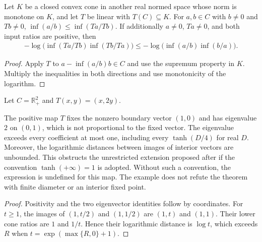 \begin{theorem}
    \label{thm:cone_ratio_positive_map}
    \leanok
    Let $K$ be a closed convex cone in another real normed space whose norm
    is monotone on $K$, and let $T$ be linear with $T(C)\subseteq K$.
    For $a,b\in C$ with $b\ne0$ and $Tb\ne0$,
    $\inf(a/b)\le \inf(Ta/Tb)$. If additionally $a\ne0$, $Ta\ne0$,
    and both input ratios are positive, then
    \begin{align}
        -\log\bigl(\inf(Ta/Tb)\inf(Tb/Ta)\bigr)
          \le -\log\bigl(\inf(a/b)\inf(b/a)\bigr).
    \end{align}
\end{theorem}
\begin{proof}\leanok
    Apply $T$ to $a-\inf(a/b)b\in C$ and use the supremum property in $K$.
    Multiply the inequalities in both directions and use monotonicity of
    the logarithm.
\end{proof}

\begin{definition}
    \label{def:expanding_quadrant_map}
    \leanok
    Let $C=\mathbb R_+^2$ and $T(x,y)=(x,2y)$.
\end{definition}

\begin{theorem}
    \label{thm:boundary_fixed_point_expansion}
    \leanok
    The positive map $T$ fixes the nonzero boundary vector $(1,0)$ and has
    eigenvalue $2$ on $(0,1)$, which is not proportional to the fixed vector.
    The eigenvalue exceeds every coefficient at most one, including every
    $\tanh(D/4)$ for real $D$. Moreover, the logarithmic distances between
    images of interior vectors are unbounded.
    This obstructs the unrestricted extension proposed after
    \cite[Chapter~8, Equation~(8.91)]{Wolf2012Quantum} if the convention
    $\tanh(+\infty)=1$ is adopted. Without such a convention, the expression
    is undefined for this map. The example does not refute the theorem with
    finite diameter or an interior fixed point.
\end{theorem}
\begin{proof}\leanok
    Positivity and the two eigenvector identities follow by coordinates.
    For $t\ge1$, the images of $(1,t/2)$ and $(1,1/2)$ are $(1,t)$ and $(1,1)$.
    Their lower cone ratios are $1$ and $1/t$. Hence their logarithmic
    distance is $\log t$, which exceeds $R$ when
    $t=\exp(\max\{R,0\}+1)$.
\end{proof}
